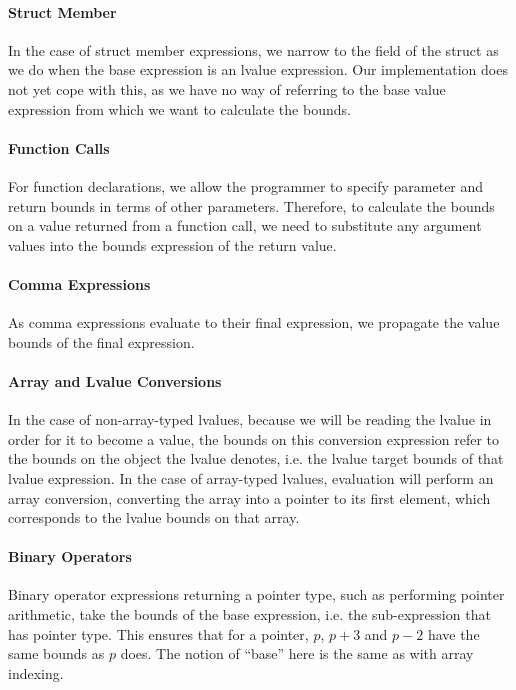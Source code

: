 \paragraph{Struct Member} In the case of struct member expressions, we
narrow to the field of the struct as we do when the base expression is
an lvalue expression. Our implementation does not yet cope with this,
as we have no way of referring to the base value expression from which
we want to calculate the bounds.

\paragraph{Function Calls} For function declarations, we allow the
programmer to specify parameter and return bounds in terms of other
parameters. Therefore, to calculate the bounds on a value returned
from a function call, we need to substitute any argument values into
the bounds expression of the return value.

\paragraph{Comma Expressions} As comma expressions evaluate to their
final expression, we propagate the value bounds of the final
expression.

\paragraph{Array and Lvalue Conversions} In the case of
non-array-typed lvalues, because we will be reading the lvalue in
order for it to become a value, the bounds on this conversion
expression refer to the bounds on the object the lvalue denotes, i.e.
the lvalue target bounds of that lvalue expression. In the case of
array-typed lvalues, evaluation will perform an array conversion,
converting the array into a pointer to its first element, which
corresponds to the lvalue bounds on that array.

\paragraph{Binary Operators} Binary operator expressions returning a
pointer type, such as performing pointer arithmetic, take the bounds
of the base expression, i.e. the sub-expression that has pointer type.
This ensures that for a pointer, $p$, $p + 3$ and $p - 2$ have the
same bounds as $p$ does. The notion of ``base'' here is the same as
with array indexing.

